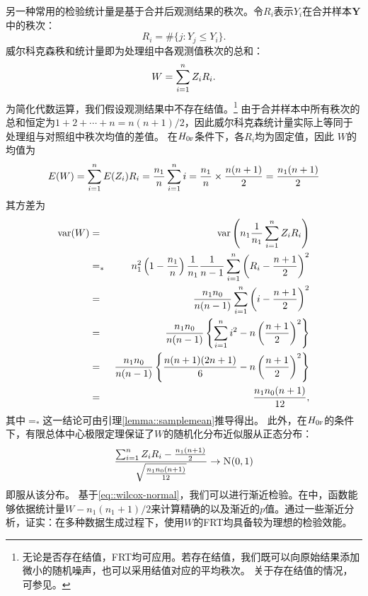 \begin{example}[威尔科克森秩和]
另一种常用的检验统计量是基于合并后观测结果的秩次。令$R_i$表示$Y_i$在合并样本$\bm{Y}$中的秩次：
$$
R_i = \#\{j : Y_j \leq Y_i  \}.
$$
威尔科克森秩和统计量即为处理组中各观测值秩次的总和：
$$
W = \sum_{i=1}^n Z_i R_i.
$$
为简化代数运算，我们假设观测结果中不存在结值。\footnote{
无论是否存在结值，FRT均可应用。若存在结值，我们既可以向原始结果添加微小的随机噪声，也可以采用结值对应的平均秩次。
关于存在结值的情况，可参见\citet[][Chapter 1 Section 4]{lehmann2006nonparametrics}。
}
由于合并样本中所有秩次的总和恒定为$1+2+\cdots + n = n(n+1)/2$，因此威尔科克森统计量实际上等同于处理组与对照组中秩次均值的差值。
在$H_{0\textsc{f}}$条件下，各$R_i$均为固定值，因此
$W$的均值为
$$
E(W)  =  \sum_{i=1}^n E(Z_i) R_i  =\frac{n_1}{n}  \sum_{i=1}^n  i   = \frac{n_1}{n} \times \frac{n(n+1)}{2} = \frac{n_1(n+1)}{2} 
$$
其方差为
\begin{eqnarray*}
\textup{var}(W) &=& \textup{var}\left( n_1 \frac{1}{n_1} \sum_{i=1}^n Z_i R_i  \right) \\
&=_*&  n_1^2  \left( 1-\frac{n_1}{n} \right)  \frac{1}{n_1}  \frac{1}{n-1} \sum_{i=1}^n \left(R_i - \frac{n+1}{2}  \right)^2\\
&=&  \frac{n_1 n_0}{n(n-1)} \sum_{i=1}^n \left(i - \frac{n+1}{2}  \right)^2\\
&=&   \frac{n_1 n_0}{n(n-1)}   \left\{ \sum_{i=1}^n i^2 - n \left(  \frac{n+1}{2}\right)^2     \right\}\\
&=&  \frac{n_1 n_0}{n(n-1)}  \left\{     \frac{n(n+1)(2n+1)}{6} -    n \left( \frac{n+1}{2}   \right)^2 \right\}  \\
&=& \frac{n_1 n_0 (n+1)}{12},
\end{eqnarray*}
其中$=_*$这一结论可由引理\ref{lemma::samplemean}推导得出。
此外，在$H_{0\textsc{f}}$的条件下，有限总体中心极限定理保证了$W$的随机化分布近似服从正态分布：
\begin{eqnarray}
\label{eq::wilcox-normal}
\frac{  \sumn Z_i R_i - \frac{n_1(n+1)}{2}   }{  \sqrt{  \frac{n_1 n_0 (n+1)}{12}   }}   \rightarrow \N01 
\end{eqnarray}
即服从该分布。
基于\eqref{eq::wilcox-normal}，我们可以进行渐近检验。在中，函数能够依据统计量$W - n_1(n_1+1)/2$来计算精确的以及渐近的$p$值。通过一些渐近分析，\citet{lehmann2006nonparametrics}证实：在多种数据生成过程下，使用$W$的FRT均具备较为理想的检验效能。
\end{example}





